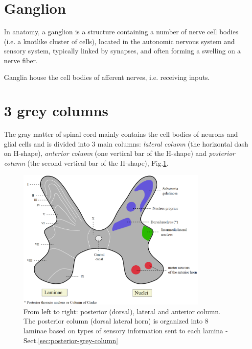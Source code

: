 \section{Ganglion}
\label{sec:ganglion}

In anatomy, a ganglion is a structure containing a number of nerve cell bodies
(i.e. a knotlike cluster of cells), located in the autonomic nervous system and
sensory system, typically linked by synapses, and often forming a swelling on a nerve fiber.

Ganglia house the cell bodies of afferent nerves, i.e. receiving inputs.


\section{3 grey columns}
\label{sec:3-grey-column}

The gray matter of spinal cord mainly contains the cell bodies of neurons and
glial cells and is divided into 3 main columns: {\it lateral column} (the
horizontal dash on H-shape), {\it anterior
column} (one vertical bar of the H-shape) and {\it posterior column} (the
second vertical bar of the H-shape),
Fig.\ref{fig:3-columns-grey-matter-spinal-cord}.


\begin{figure}[htb]
  \centerline{\includegraphics[height=7cm]{./images/3-columns-grey-matter-spinal-cord.eps}}
  \caption{From left to right:
  posterior (dorsal), lateral and
  anterior column. The posterior
  column (dorsal lateral horn) is
  organized into 8 laminae based
  on types of sensory information
  sent to each lamina -
  Sect.\ref{sec:posterior-grey-column}}\label{fig:3-columns-grey-matter-spinal-cord}
\end{figure}
  

